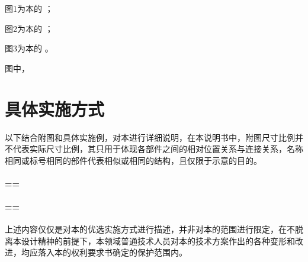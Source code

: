 \documentclass[heading=true,zihao=-4]{ctexart}
\def\DRAFTNUM{}
\begin{document}
图1为本\pattype 的 ；

图2为本\pattype 的 ；

图3为本\pattype 的 。


\def\fignum{3}


图中，

\numbl

\section{具体实施方式}


以下结合附图和具体实施例，对本\pattype 进行详细说明，在本说明书中，附图尺寸比例并不代表实际尺寸比例，其只用于体现各部件之间的相对位置关系与连接关系，名称相同或标号相同的部件代表相似或相同的结构，且仅限于示意的目的。


\paragraph{==}

\paragraph{==}







上述内容仅仅是对本\pattype 的优选实施方式进行描述，并非对本\pattype 的范围进行限定，在不脱离本\pattype 设计精神的前提下，本领域普通技术人员对本\pattype 的技术方案作出的各种变形和改进，均应落入本\pattype 的权利要求书确定的保护范围内。

\ifdefined\DRAFTNUM
  \nolinenumbers 
\fi


\ifx\allfiles\undefined
\end{document}
